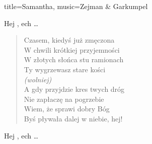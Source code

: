\begin{song}{title={Samantha}, music={Zejman \& Garkumpel}}
\begin{multicols}{2}
\begin{chorus}
        Hej , ech \ldots
    \end{chorus}
    \begin{verse}
        Czasem, kiedyś już zmęczona \\
        W chwili krótkiej przyjemności \\
        W złotych słońca stu ramionach \\
        Ty wygrzewasz stare kości \medskip \\
        \textit{(wolniej)} \\
        A gdy przyjdzie kres twych dróg \\
        Nie zapłaczę na pogrzebie \\
        Wiem, że sprawi dobry Bóg \\
        Byś pływała dalej w niebie, hej!
    \end{verse}
    \begin{chorus}
        Hej , ech \ldots
    \end{chorus}
    \end{multicols}
\end{song}

